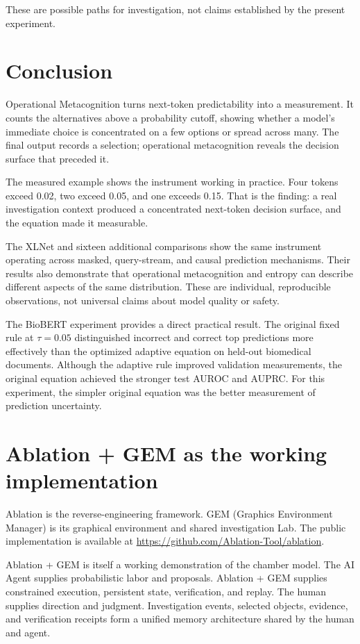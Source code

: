 \documentclass[11pt,a4paper]{article}
\begin{document}
These are possible paths for investigation, not claims established by the present experiment.

\section{Conclusion}
Operational Metacognition turns next-token predictability into a measurement. It counts the alternatives above a probability cutoff, showing whether a model's immediate choice is concentrated on a few options or spread across many. The final output records a selection; operational metacognition reveals the decision surface that preceded it.

The measured example shows the instrument working in practice. Four tokens exceed 0.02, two exceed 0.05, and one exceeds 0.15. That is the finding: a real investigation context produced a concentrated next-token decision surface, and the equation made it measurable.

The XLNet and sixteen additional comparisons show the same instrument operating across masked, query-stream, and causal prediction mechanisms. Their results also demonstrate that operational metacognition and entropy can describe different aspects of the same distribution. These are individual, reproducible observations, not universal claims about model quality or safety.

The BioBERT experiment provides a direct practical result. The original fixed rule at $\tau=0.05$ distinguished incorrect and correct top predictions more effectively than the optimized adaptive equation on held-out biomedical documents. Although the adaptive rule improved validation measurements, the original equation achieved the stronger test AUROC and AUPRC. For this experiment, the simpler original equation was the better measurement of prediction uncertainty.

\appendix

\section{Ablation + GEM as the working implementation}
Ablation is the reverse-engineering framework. GEM (Graphics Environment Manager) is its graphical environment and shared investigation Lab. The public implementation is available at \url{https://github.com/Ablation-Tool/ablation}.

Ablation + GEM is itself a working demonstration of the chamber model. The AI Agent supplies probabilistic labor and proposals. Ablation + GEM supplies constrained execution, persistent state, verification, and replay. The human supplies direction and judgment. Investigation events, selected objects, evidence, and verification receipts form a unified memory architecture shared by the human and agent.
\end{document}
